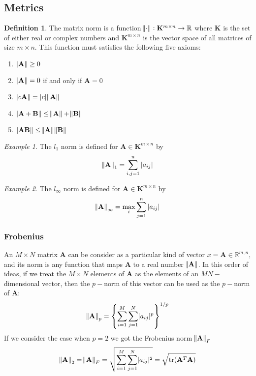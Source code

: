 \documentclass[11pt]{article}
\theoremstyle{definition}
\newtheorem{definition}{Definition}[section]
\theoremstyle{remark}
\theoremstyle{remark}
\theoremstyle{remark}
\newtheorem{example}{Example}
\newcommand{\R}{{\mathbb{R}}}
\begin{document}
\subsection{Metrics}
\begin{definition}
  The matrix norm is a function $\norm{\cdot}: \mathbf{K}^{m \times n} \to \R$
  where $\mathbf{K}$ is the set of either real or complex numbers and
  $\mathbf{K}^{m \times n}$ is the vector space of all matrices of size
  $m \times n$. This function must satisfies the following five axioms:
  \begin{enumerate}
    \item $\norm{\mathbf{A}} \geq 0$
    \item $\norm{\mathbf{A}} = 0$ if and only if $\mathbf{A} = 0$
    \item $\norm{c\mathbf{A}} = |c|\norm{\mathbf{A}}$
    \item $\norm{\mathbf{A} + \mathbf{B}} \leq \norm{\mathbf{A}} + \norm{\mathbf{B}}$
    \item $\norm{\mathbf{AB}} \leq \norm{\mathbf{A}}\norm{\mathbf{B}}$
  \end{enumerate}
\end{definition}

\begin{example}
  The $l_{1}$ norm is defined for $\mathbf{A} \in \mathbf{K}^{m \times n}$ by
  \[
    \norm{\mathbf{A}}_{1} = \sum_{i,j = 1}^{n} |a_{ij}|
  \]
\end{example}

\begin{example}
  The $l_{\infty}$ norm is defined for $\mathbf{A} \in \mathbf{K}^{m \times n}$
  by
  \[
    \norm{\mathbf{A}}_{\infty} = \max_{i}{\sum_{j = 1}^{n} |a_{ij}|}
  \]
\end{example}

\subsubsection{Frobenius}
An $M \times N$ matrix $\mathbf{A}$ can be consider as a particular kind of
vector $x = \mathbf{A} \in \R^{m,n}$, and its norm is any function that maps
$\mathbf{A}$ to a real number $\norm{\mathbf{A}}$. In this order of ideas, if we
treat the $M \times N$ elements of $\mathbf{A}$ as the elements of an
$MN-$dimensional vector, then the $p-$norm of this vector can be used as the
$p-$norm of $\mathbf{A}$:
%
\[
  \norm{\mathbf{A}}_{p} = \left\{ \sum_{i = 1}^{M} \sum_{j=1}^{N} \lvert a_{ij} \rvert^{p} \right\}^{1/p}
\]
%
If we consider the case when $p = 2$ we got the Frobenius norm
$\norm{\mathbf{A}}_{F}$
%
\[
  \norm{\mathbf{A}}_{2} = \norm{\mathbf{A}}_{F} = \sqrt{\sum_{i=1}^{M} \sum_{j=1}^{N} \lvert a_{ij} \rvert^{2}} = \sqrt{\mathrm{tr}(\mathbf{A}^{T}\mathbf{A})}
\]
\end{document}
